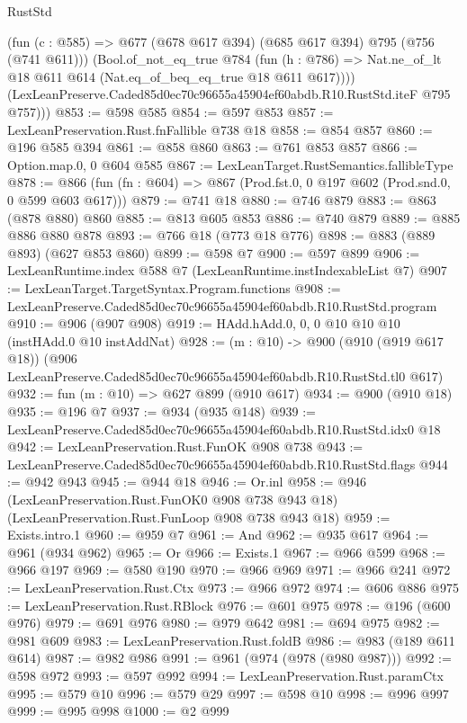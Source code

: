 \begin{lexlean}{RustStd}
\begin{coremodule}
          (fun (c : @585) => @677 (@678 @617 @394) (@685 @617 @394) @795 (@756 (@741 @611)))
          (Bool.of_not_eq_true
            @784
            (fun (h : @786) => Nat.ne_of_lt @18 @611 @614 (Nat.eq_of_beq_eq_true @18 @611 @617))))
        (LexLeanPreserve.Caded85d0ec70c96655a45904ef60abdb.R10.RustStd.iteF @795 @757)))
@853 := @598 @585
@854 := @597 @853
@857 := LexLeanPreservation.Rust.fnFallible @738 @18
@858 := @854 @857
@860 := @196 @585 @394
@861 := @858 @860
@863 := @761 @853 @857
@866 := Option.map.{0, 0} @604 @585
@867 := LexLeanTarget.RustSemantics.fallibleType
@878 := @866 (fun (fn : @604) => @867 (Prod.fst.{0, 0} @197 @602 (Prod.snd.{0, 0} @599 @603 @617)))
@879 := @741 @18
@880 := @746 @879
@883 := @863 (@878 @880) @860
@885 := @813 @605 @853
@886 := @740 @879
@889 := @885 @886 @880 @878
@893 := @766 @18 (@773 @18 @776)
@898 := @883 (@889 @893) (@627 @853 @860)
@899 := @598 @7
@900 := @597 @899
@906 := LexLeanRuntime.index @588 @7 (LexLeanRuntime.instIndexableList @7)
@907 := LexLeanTarget.TargetSyntax.Program.functions
@908 := LexLeanPreserve.Caded85d0ec70c96655a45904ef60abdb.R10.RustStd.program
@910 := @906 (@907 @908)
@919 := HAdd.hAdd.{0, 0, 0} @10 @10 @10 (instHAdd.{0} @10 instAddNat)
@928 := (m : @10) ->
  @900
    (@910 (@919 @617 @18))
    (@906 LexLeanPreserve.Caded85d0ec70c96655a45904ef60abdb.R10.RustStd.tl0 @617)
@932 := fun (m : @10) => @627 @899 (@910 @617)
@934 := @900 (@910 @18)
@935 := @196 @7
@937 := @934 (@935 @148)
@939 := LexLeanPreserve.Caded85d0ec70c96655a45904ef60abdb.R10.RustStd.idx0 @18
@942 := LexLeanPreservation.Rust.FunOK @908 @738
@943 := LexLeanPreserve.Caded85d0ec70c96655a45904ef60abdb.R10.RustStd.flags
@944 := @942 @943
@945 := @944 @18
@946 := Or.inl
@958 := @946
    (LexLeanPreservation.Rust.FunOK0 @908 @738 @943 @18)
    (LexLeanPreservation.Rust.FunLoop @908 @738 @943 @18)
@959 := Exists.intro.{1}
@960 := @959 @7
@961 := And
@962 := @935 @617
@964 := @961 (@934 @962)
@965 := Or
@966 := Exists.{1}
@967 := @966 @599
@968 := @966 @197
@969 := @580 @190
@970 := @966 @969
@971 := @966 @241
@972 := LexLeanPreservation.Rust.Ctx
@973 := @966 @972
@974 := @606 @886
@975 := LexLeanPreservation.Rust.RBlock
@976 := @601 @975
@978 := @196 (@600 @976)
@979 := @691 @976
@980 := @979 @642
@981 := @694 @975
@982 := @981 @609
@983 := LexLeanPreservation.Rust.foldB
@986 := @983 (@189 @611 @614)
@987 := @982 @986
@991 := @961 (@974 (@978 (@980 @987)))
@992 := @598 @972
@993 := @597 @992
@994 := LexLeanPreservation.Rust.paramCtx
@995 := @579 @10
@996 := @579 @29
@997 := @598 @10
@998 := @996 @997
@999 := @995 @998
@1000 := @2 @999

\end{coremodule}
\end{lexlean}
